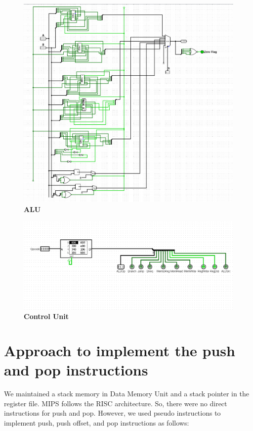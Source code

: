 \documentclass{article}
\begin{document}
\begin{figure}[b]
    \centering
    \includegraphics[scale = 0.75]{Images/ALU.png}
    \caption{\textbf{ALU}}
\end{figure}

\begin{figure}[t]
    \centering
    \includegraphics[scale = 0.6]{Images/Control Unit.png}
    \caption{\textbf{Control Unit}}
\end{figure}
\clearpage

\section{Approach to implement the push and pop instructions}

We maintained a stack memory in Data Memory Unit and a stack pointer in the register file. MIPS follows the RISC architecture. So, there were no direct instructions for push and pop. However, we used pseudo instructions to implement push, push offset, and pop instructions as follows:
\end{document}
